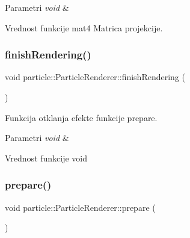 \begin{DoxyParams}{Parametri}
{\em void} & \\
\hline
\end{DoxyParams}
\begin{DoxyReturn}{Vrednost funkcije}
mat4 Matrica projekcije. 
\end{DoxyReturn}
\mbox{\label{classparticle_1_1ParticleRenderer_ae0a3632a3579890f93aeade2096d6d58}} 
\subsubsection{\texorpdfstring{finish\+Rendering()}{finishRendering()}}
{\footnotesize\ttfamily void particle\+::\+Particle\+Renderer\+::finish\+Rendering (\begin{DoxyParamCaption}{ }\end{DoxyParamCaption})\hspace{0.3cm}{\ttfamily [private]}}



Funkcija otklanja efekte funkcije prepare. 


\begin{DoxyParams}{Parametri}
{\em void} & \\
\hline
\end{DoxyParams}
\begin{DoxyReturn}{Vrednost funkcije}
void 
\end{DoxyReturn}
\mbox{\label{classparticle_1_1ParticleRenderer_a213703d9e95935b0b10f13363eff9748}} 
\subsubsection{\texorpdfstring{prepare()}{prepare()}}
{\footnotesize\ttfamily void particle\+::\+Particle\+Renderer\+::prepare (\begin{DoxyParamCaption}\item[{void}]{ }\end{DoxyParamCaption})\hspace{0.3cm}{\ttfamily [private]}}



